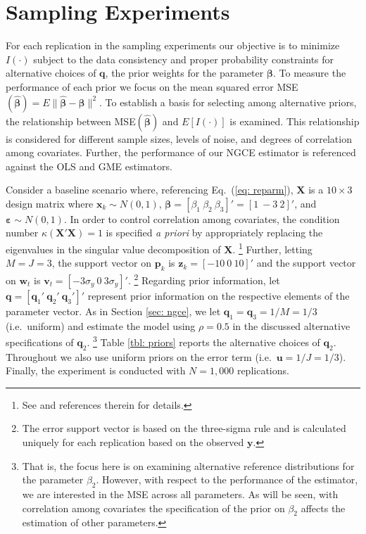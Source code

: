 \documentclass{elsarticle}
\begin{document}
\section{Sampling Experiments}
\label{sec: mce}

For each replication in the sampling experiments our objective is to minimize 
$I(\cdot)$ subject to the data consistency and proper probability constraints 
for alternative choices of $\mathbf{q}$, the prior weights for the parameter 
$\mathbf{\beta}$. 
To measure the performance of each prior we focus on the mean squared 
error MSE$(\hat{\mathbf{\beta}}) = E \| \hat{\mathbf{\beta}}- 
\mathbf{\beta}\|^2$.
To establish a basis for selecting among alternative priors, the relationship 
between MSE$(\hat{\mathbf{\beta}})$ and $E[I(\cdot)]$ is examined.
This relationship is considered for different sample sizes, levels of noise, 
and degrees of correlation among covariates.
Further, the performance of our NGCE estimator is referenced 
against the OLS and GME estimators.

Consider a baseline scenario where, referencing Eq.\ (\ref{eq: reparm}),
$\mathbf{X}$ is a $10 \times 3$ design matrix where $\mathbf{x}_k \sim 
N(0,1)$, $\mathbf{\beta}= [\beta_1 ~ \beta_2 ~ \beta_3]'=[1 ~ -3 ~ 2]'$, 
and $\mathbf{\varepsilon} \sim N(0,1)$.
In order to control correlation among covariates, the condition
number $\kappa(\mathbf{X}'\mathbf{X})=1$ is specified \textit{a priori}
by appropriately replacing the eigenvalues in the singular value 
decomposition of $\mathbf{X}$.%
\footnote{See \citet[pg.\ 133]{golan1996} and references therein for 
details.}
Further, letting $M=J=3$, the support vector on $\mathbf{p}_k$ is 
$\mathbf{z}_k = [- 10 ~ 0 ~ 10]'$ and the support vector on $\mathbf{w}_t$ 
is $\mathbf{v}_t = [- 3\sigma_y ~ 0 ~ 3\sigma_y]'$.%
\footnote{The error support vector is based on the three-sigma
rule \citep{pukelsheim1994} and is calculated 
uniquely for each replication based on the observed $\mathbf{y}$.}
Regarding prior information, let $\mathbf{q} = [\mathbf{q}_1' ~ 
\mathbf{q}_2' ~ \mathbf{q}_3']'$ represent prior information on the 
respective elements of the parameter vector.
As in Section \ref{sec: ngce}, we let $\mathbf{q}_1 = \mathbf{q}_3 = 1/M 
= 1/3$ (i.e.\ uniform) and estimate the model using $\rho=0.5$  in the 
discussed alternative specifications of $\mathbf{q}_2$.%
\footnote{That is, the focus here is on examining alternative reference 
distributions for the parameter $\beta_2$. 
However, with respect to the performance of the estimator, we are 
interested in the MSE across all parameters.
As will be seen, with correlation among covariates the specification of the 
prior on $\beta_2$ affects the estimation of other parameters.}
Table \ref{tbl: priors} reports the alternative choices of $\mathbf{q}_2$.
Throughout we also use uniform priors on the error term 
(i.e.\ $\mathbf{u} = 1/J = 1/3$).
Finally, the experiment is conducted with $N=1,000$ replications.
\end{document}
